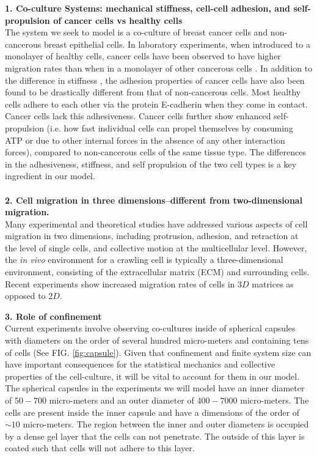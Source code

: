 \documentclass[aps,prb,twocolumn,groupedaddress,nofootinbib,floatfix]{revtex4}
\begin{document}
{\bf 1. Co-culture Systems: mechanical stiffness, cell-cell adhesion, and self-propulsion of cancer cells vs healthy cells}\\
The system we seek to model is a co-culture of breast cancer cells and non-cancerous breast epithelial cells. 
In laboratory experiments, when introduced to a monolayer of healthy cells, cancer cells have been observed to have higher migration rates than when in a monolayer of other cancerous cells \cite{Lee}.
In addition to the difference in stiffness \cite{Lee}, the adhesion properties of cancer cells have also been found to be drastically different from that of non-cancerous cells\cite{Jeanes}.
Most healthy cells adhere to each other via the protein E-cadherin when they come in contact. Cancer cells lack this adhesiveness. Cancer cells further show enhanced self-propulsion (i.e. how fast individual cells can propel themselves by consuming ATP or due to other internal forces in the absence of any other 
interaction forces), compared to non-cancerous cells of the same tissue type. The differences in the adhesiveness, stiffness, and self propulsion of the two cell types is a key ingredient in our model.\\
\\

{\bf 2. Cell migration in three dimensions--different from two-dimensional migration.}\\
Many experimental and theoretical studies have addressed various aspects of cell migration in two dimensions, including protrusion, adhesion, and retraction at the level of single cells, and collective motion at the multicellular level.
However, the {\it in vivo} environment for a crawling cell is typically a three-dimensional environment, consisting of the extracellular matrix (ECM) and surrounding cells.
Recent experiments show increased migration rates of cells in $3D$ matrices as opposed to  $2D$\cite{Cukierman}.

{\bf 3. Role of confinement}\\
Current experiments involve observing co-cultures inside of spherical capsules with diameters on the order of several hundred micro-meters and containing tens of cells\cite{Alessandri} (See FIG. \ref{fig:capsule}).
Given that confinement and finite system size can have important consequences for the statistical mechanics and collective properties of the cell-culture, it will be vital to account for them in our model.
The spherical capsules in the experiments we will model have an inner diameter of $50-700$ micro-meters and an outer diameter of $400-7000$ micro-meters.
The cells are present inside the inner capsule and have a dimensions of the order of $\sim 10$ micro-meters.
The region between the inner and outer diameters is occupied by a dense gel layer that the cells can not penetrate.
The outside of this layer is coated such that cells will not adhere to this layer. \\
\end{document}
